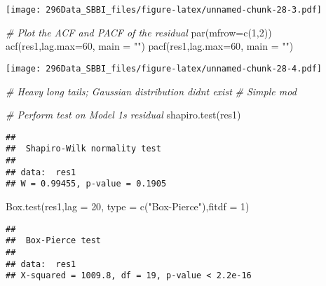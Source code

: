 \documentclass[
]{article}
\newenvironment{Shaded}{\begin{snugshade}}{\end{snugshade}}
\newcommand{\AttributeTok}[1]{\textcolor[rgb]{0.77,0.63,0.00}{#1}}
\newcommand{\CommentTok}[1]{\textcolor[rgb]{0.56,0.35,0.01}{\textit{#1}}}
\newcommand{\DecValTok}[1]{\textcolor[rgb]{0.00,0.00,0.81}{#1}}
\newcommand{\FunctionTok}[1]{\textcolor[rgb]{0.00,0.00,0.00}{#1}}
\newcommand{\NormalTok}[1]{#1}
\newcommand{\StringTok}[1]{\textcolor[rgb]{0.31,0.60,0.02}{#1}}
\begin{document}
\texttt{[image: 296Data\_SBBI\_files/figure-latex/unnamed-chunk-28-3.pdf]}

\begin{Shaded}
\begin{Highlighting}[]
\CommentTok{\# Plot the ACF and PACF of the residual}
\FunctionTok{par}\NormalTok{(}\AttributeTok{mfrow=}\FunctionTok{c}\NormalTok{(}\DecValTok{1}\NormalTok{,}\DecValTok{2}\NormalTok{)) }
\FunctionTok{acf}\NormalTok{(res1,}\AttributeTok{lag.max=}\DecValTok{60}\NormalTok{, }\AttributeTok{main =} \StringTok{""}\NormalTok{) }
\FunctionTok{pacf}\NormalTok{(res1,}\AttributeTok{lag.max=}\DecValTok{60}\NormalTok{, }\AttributeTok{main =} \StringTok{""}\NormalTok{)}
\end{Highlighting}
\end{Shaded}

\texttt{[image: 296Data\_SBBI\_files/figure-latex/unnamed-chunk-28-4.pdf]}

\begin{Shaded}
\begin{Highlighting}[]
\CommentTok{\# Heavy long tails; Gaussian distribution didn\textquotesingle{}t exist}
\CommentTok{\# Simple mod}
\end{Highlighting}
\end{Shaded}

\begin{Shaded}
\begin{Highlighting}[]
\CommentTok{\# Perform test on Model 1\textquotesingle{}s residual}
\FunctionTok{shapiro.test}\NormalTok{(res1)}
\end{Highlighting}
\end{Shaded}

\begin{verbatim}
## 
##  Shapiro-Wilk normality test
## 
## data:  res1
## W = 0.99455, p-value = 0.1905
\end{verbatim}

\begin{Shaded}
\begin{Highlighting}[]
\FunctionTok{Box.test}\NormalTok{(res1,}\AttributeTok{lag =} \DecValTok{20}\NormalTok{, }\AttributeTok{type =} \FunctionTok{c}\NormalTok{(}\StringTok{"Box{-}Pierce"}\NormalTok{),}\AttributeTok{fitdf =} \DecValTok{1}\NormalTok{) }
\end{Highlighting}
\end{Shaded}

\begin{verbatim}
## 
##  Box-Pierce test
## 
## data:  res1
## X-squared = 1009.8, df = 19, p-value < 2.2e-16
\end{verbatim}
\end{document}
